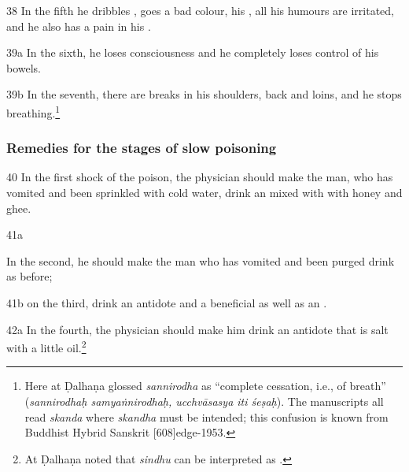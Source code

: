 \begin{translation}
     \item[38]
    In the fifth he dribbles , goes a bad colour,
    his ,  all his humours are irritated, and he
    also has a pain in his .
   
   
    \item[39a]
    In the sixth, he loses consciousness and he completely loses
    control of his bowels.
    
    \item[39b]
    In the seventh, there are breaks in his shoulders, back and loins, and he  
stops breathing.\footnote{%
Here at  Ḍalhaṇa glossed \emph{sannirodha} as
“complete cessation, i.e., of breath” (\emph{sannirodhaḥ 
samyaṅnirodhaḥ, ucchvāsasya iti śeṣaḥ}).
The manuscripts all read \emph{skanda} where \emph{skandha} must be 
intended; this confusion is known from Buddhist Hybrid Sanskrit 
[608]{edge-1953}.}
    
    
    
\subsubsection{Remedies for the stages of slow poisoning}
  \label{dusivisa}
  
    \item[40] In the first shock of the poison, the physician should make the man,
who has vomited and been sprinkled with cold water, drink an
 mixed with with honey and ghee.
    
    \item[41a] 
    
In the second, he should make the man who has vomited and been
purged drink as before;
    
    \item[41b]
    on the third, drink an antidote and a beneficial
     as well as an .
    
    
    \item[42a] In the fourth, the physician should make him drink an antidote that
is salt with a little oil.\footnote{At  Ḍalhaṇa noted that
\emph{sindhu} can be interpreted as .}
    

\end{translation}
